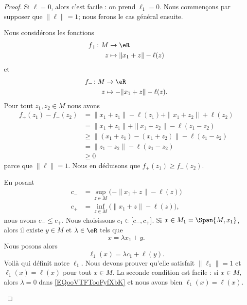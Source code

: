 \begin{proof}
	Si \( \ell=0\), alors c'est facile : on prend \( \ell_1=0\). Nous commençons par supposer que \( \| \ell \|=1\); nous ferons le cas général ensuite.
	\begin{subproof}
		Nous considérons les fonctions
		\begin{equation}
			\begin{aligned}
				f_+\colon M & \to \eR                     \\
				z           & \mapsto \| x_1+z \|-\ell(z)
			\end{aligned}
		\end{equation}
		et
		\begin{equation}
			\begin{aligned}
				f_-\colon M & \to \eR                       \\
				z           & \mapsto -\| x_1+z \|-\ell(z).
			\end{aligned}
		\end{equation}
		Pour tout \( z_1,z_2\in M\) nous avons
		\begin{subequations}
			\begin{align}
				f_+(z_1)-f_-(z_2) & =\| x_1+z_1 \|-\ell(z_1)+\| x_1+z_2 \|+\ell(z_2) \\
				                  & =\| x_1+z_1 \|+\| x_1+z_2 \|-\ell(z_1-z_2)       \\
				                  & \geq \| (x_1+z_1)-(x_1+z_2) \|-\ell(z_1-z_2)     \\
				                  & =\| z_1-z_2  \|-\ell(z_1-z_2)                    \\
				                  & \geq 0
			\end{align}
		\end{subequations}
		parce que \( \| \ell \|=1\). Nous en déduisons que \( f_+(z_1)\geq f_-(z_2)\).


		En posant
		\begin{subequations}
			\begin{align}
				c_- & =\sup_{z\in M}\big( -\| x_1+z \|-\ell(z) \big)  \\
				c_+ & =\inf_{z\in M}\big(  \| x_1+z \|-\ell(z) \big),
			\end{align}
		\end{subequations}
		nous avons \( c_-\leq c_+\). Nous choisissons \( c_1\in \mathopen[ c_- , c_+ \mathclose]\).
		\spitem[La définition]
		Si \( x\in M_1=\Span{M,x_1}\), alors il existe \( y\in M\) et \( \lambda\in \eR\) tels que
		\begin{equation}
			x=\lambda x_1+y.
		\end{equation}
		Nous posons alors
		\begin{equation}        \label{EQooVTFTooFyfXbK}
			\ell_1(x)=\lambda c_1+\ell(y).
		\end{equation}
		Voilà qui définit notre \( \ell_1\). Nous devons prouver qu'elle satisfait \( \| \ell_1 \|=1\) et \( \ell_1(x)=\ell(x)\) pour tout \( x\in M\). La seconde condition est facile : si \( x\in M\), alors \( \lambda=0\) dans \eqref{EQooVTFTooFyfXbK} et nous avons bien \( \ell_1(x)=\ell(x)\).


\end{subproof}
\end{proof}
